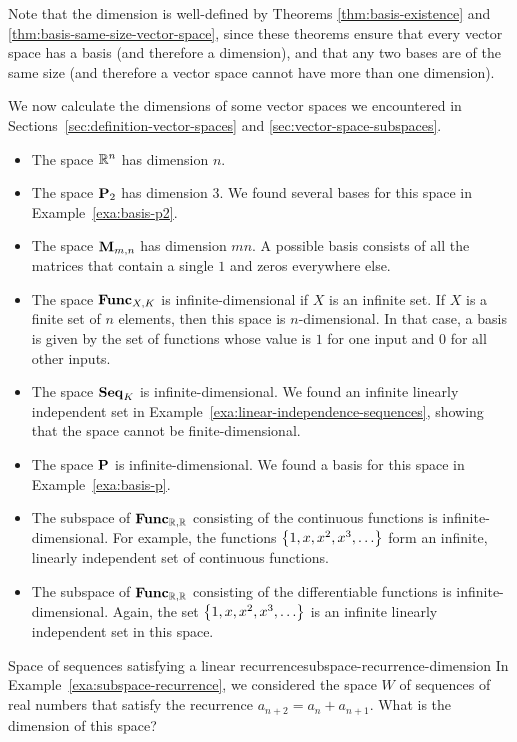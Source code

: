 Note that the dimension is well-defined by Theorems
{\ref{thm:basis-existence}} and
{\ref{thm:basis-same-size-vector-space}}, since these theorems ensure
that every vector space has a basis (and therefore a dimension), and
that any two bases are of the same size (and therefore a vector space
cannot have more than one dimension).

We now calculate the dimensions of some vector spaces we encountered in
Sections~\ref{sec:definition-vector-spaces} and
{\ref{sec:vector-space-subspaces}}.

\begin{itemize}
\item The space $\mathbb{R}^n$ has dimension $n$.
\item The space $\mathbf{P}_2$ has dimension $3$. We found several bases
  for this space in Example~\ref{exa:basis-p2}.
\item The space $\mathbf{M}_{m,n}$ has dimension $mn$. A possible basis
  consists of all the matrices that contain a single $1$ and zeros
  everywhere else.
\item The space $\mathbf{Func}_{X,K}$ is infinite-dimensional if $X$ is an
  infinite set. If $X$ is a finite set of $n$ elements, then this
  space is $n$-dimensional. In that case, a basis is given by the set
  of functions whose value is $1$ for one input and $0$ for all other
  inputs.
\item The space $\mathbf{Seq}_K$ is infinite-dimensional. We found an infinite
  linearly independent set in
  Example~\ref{exa:linear-independence-sequences}, showing that the
  space cannot be finite-dimensional.
\item The space $\mathbf{P}$ is infinite-dimensional. We found a basis for
  this space in Example~\ref{exa:basis-p}.
\item The subspace of $\mathbf{Func}_{\mathbb{R},\mathbb{R}}$ consisting of the continuous
  functions is infinite-dimensional. For example, the functions
  $\left\{1,x,x^2,x^3,\ldots\right\}$ form an infinite, linearly independent
  set of continuous functions.
\item The subspace of $\mathbf{Func}_{\mathbb{R},\mathbb{R}}$ consisting of the differentiable
  functions is infinite-dimensional. Again, the set
  $\left\{1,x,x^2,x^3,\ldots\right\}$ is an infinite linearly independent set
  in this space.
\end{itemize}

\begin{example}{Space of sequences satisfying a linear recurrence}{subspace-recurrence-dimension}
  In Example~\ref{exa:subspace-recurrence}, we considered the space
  $W$ of sequences of real numbers that satisfy the recurrence%
  $a_{n+2}=a_n+a_{n+1}$. What is the dimension of this space?
\end{example}

